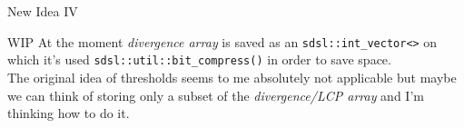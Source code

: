 \documentclass{beamer}
\begin{document}
\begin{frame}{New Idea IV}
  \begin{block}{WIP}
    At the moment \textit{divergence array} is saved as an
    \texttt{sdsl::int\_vector<>} on which it's used
    \texttt{sdsl::util::bit\_compress()} in order to save space.\\
    The original idea of thresholds seems to me absolutely not applicable but
    maybe we can think of storing only a subset of the \textit{divergence/LCP
      array} and I'm thinking how to do it.   
  \end{block}
\end{frame}
\end{document}
